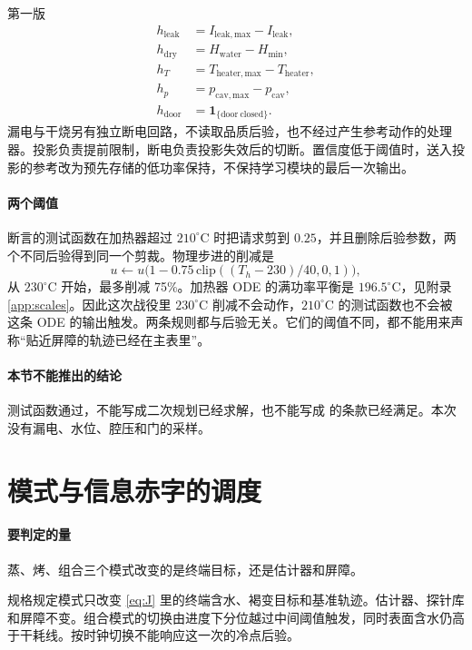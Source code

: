 第一版
\begin{align}
h_{\mathrm{leak}}&=I_{\mathrm{leak,max}}-I_{\mathrm{leak}},\\
h_{\mathrm{dry}}&=H_{\mathrm{water}}-H_{\min},\\
h_{T}&=T_{\mathrm{heater,max}}-T_{\mathrm{heater}},\\
h_{p}&=p_{\mathrm{cav,max}}-p_{\mathrm{cav}},\\
h_{\mathrm{door}}&=\mathbf{1}_{\{\mathrm{door\ closed}\}}.
\end{align}
漏电与干烧另有独立断电回路，不读取品质后验，也不经过产生参考动作的处理器。投影负责提前限制，断电负责投影失效后的切断。置信度低于阈值时，送入投影的参考改为预先存储的低功率保持，不保持学习模块的最后一次输出。

\paragraph{两个阈值}
断言的测试函数在加热器超过 \(210^\circ\mathrm{C}\) 时把请求剪到 \(0.25\)，并且删除后验参数，两个不同后验得到同一个剪裁。物理步进的削减是
\begin{equation}
u\leftarrow u\big(1-0.75\,\mathrm{clip}((T_h-230)/40,0,1)\big),
\end{equation}
从 \(230^\circ\mathrm{C}\) 开始，最多削减 75\%。加热器 ODE 的满功率平衡是 \(196.5^\circ\mathrm{C}\)，见附录 \ref{app:scales}。因此这次战役里 \(230^\circ\mathrm{C}\) 削减不会动作，\(210^\circ\mathrm{C}\) 的测试函数也不会被这条 ODE 的输出触发。两条规则都与后验无关。它们的阈值不同，都不能用来声称“贴近屏障的轨迹已经在主表里”。

\paragraph{本节不能推出的结论}
测试函数通过，不能写成二次规划已经求解，也不能写成 \cite{iec60335,gb4706} 的条款已经满足。本次没有漏电、水位、腔压和门的采样。

\section{模式与信息赤字的调度}

\paragraph{要判定的量}
蒸、烤、组合三个模式改变的是终端目标，还是估计器和屏障。

规格规定模式只改变 \eqref{eq:J} 里的终端含水、褐变目标和基准轨迹。估计器、探针库和屏障不变。组合模式的切换由进度下分位越过中间阈值触发，同时表面含水仍高于干耗线。按时钟切换不能响应这一次的冷点后验。

